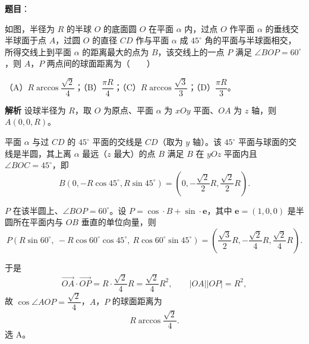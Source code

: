 \begin{answer}

\textbf{题目}：

如图，半径为 $R$ 的半球 $O$ 的底面圆 $O$ 在平面 $\alpha$ 内，过点 $O$ 作平面 $\alpha$ 的垂线交半球面于点 $A$，过圆 $O$ 的直径 $CD$ 作与平面 $\alpha$ 成 $45^\circ$ 角的平面与半球面相交，所得交线上到平面 $\alpha$ 的距离最大的点为 $B$，该交线上的一点 $P$ 满足 $\angle BOP=60^\circ$，则 $A$，$P$ 两点间的球面距离为\mbox{（　　）}
\nopagebreak[4]
\begin{center}\end{center}
\nopagebreak[4]
（A）$R\arccos\dfrac{\sqrt2}{4}$；（B）$\dfrac{\pi R}{4}$；（C）$R\arccos\dfrac{\sqrt3}{3}$；（D）$\dfrac{\pi R}{3}$。

\textbf{解析}
设球半径为 $R$，取 $O$ 为原点、平面 $\alpha$ 为 $xOy$ 平面、$OA$ 为 $z$ 轴，则 $A(0,0,R)$。

平面 $\alpha$ 与过 $CD$ 的 $45^\circ$ 平面的交线是 $CD$（取为 $y$ 轴）。该 $45^\circ$ 平面与球面的交线是半圆，其上离 $\alpha$ 最远（$z$ 最大）的点 $B$ 满足 $B$ 在 $yOz$ 平面内且 $\angle BOC=45^\circ$，即
\nopagebreak[4]
\[B\left(0,-R\cos45^\circ,R\sin45^\circ\right)=\left(0,-\frac{\sqrt2}2R,\frac{\sqrt2}2R\right).\]

$P$ 在该半圆上、$\angle BOP=60^\circ$。设 $P=\cos\cdot B+\sin\cdot \boldsymbol e$，其中 $\boldsymbol e=(1,0,0)$ 是半圆所在平面内与 $OB$ 垂直的单位向量，则
\nopagebreak[4]
\[P\left(R\sin60^\circ,\ -R\cos60^\circ\cos45^\circ,\ R\cos60^\circ\sin45^\circ\right)=\left(\frac{\sqrt3}2R,-\frac{\sqrt2}4R,\frac{\sqrt2}4R\right).\]

于是
\nopagebreak[4]
\[\overrightarrow{OA}\cdot\overrightarrow{OP}=R\cdot\frac{\sqrt2}4R=\frac{\sqrt2}4R^2,\qquad |OA||OP|=R^2,\]
故 $\cos\angle AOP=\dfrac{\sqrt2}4$，$A$，$P$ 的球面距离为
\nopagebreak[4]
\[R\arccos\frac{\sqrt2}4.\]
选 A。


\end{answer}
